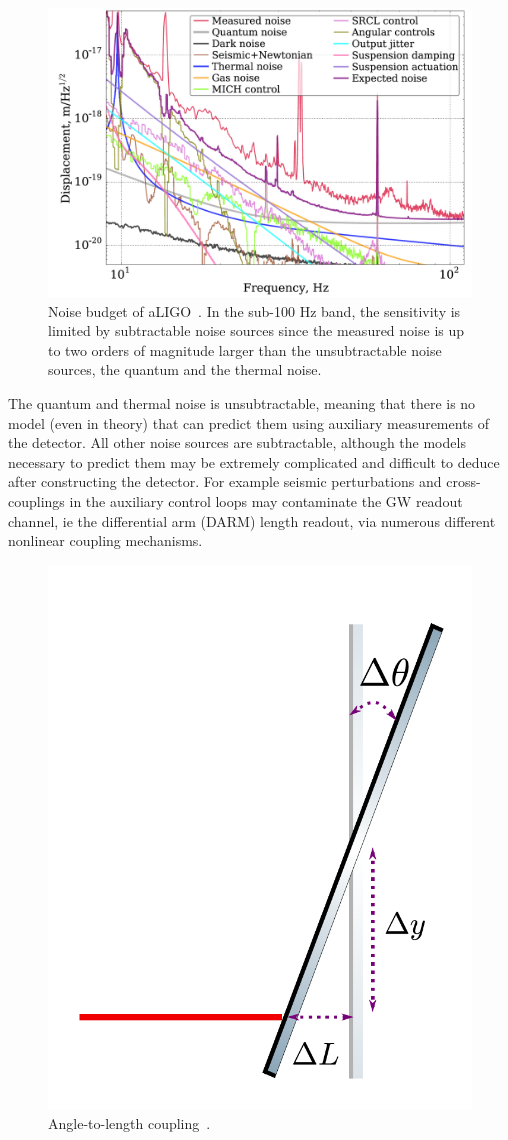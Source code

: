 \begin{refsection}
\begin{figure}[htbp]
   \centering
   \includegraphics[width=\columnwidth]{chapter_noise_sub/etc/noiseBudget}
   \caption[Noise Budget]{Noise budget of aLIGO~\cite{Martynov:16}.
     In the sub-100 Hz band, the sensitivity is limited by subtractable noise sources since the measured noise is up to two orders of magnitude larger than the unsubtractable noise sources, the quantum and the thermal noise.}
   \label{fig:noiseBudget}
\end{figure}

The quantum and thermal noise is unsubtractable, meaning that there is no model (even in theory) that can predict them using auxiliary measurements of the detector. All other noise sources are subtractable, although the models necessary to predict them may be extremely complicated and difficult to deduce after constructing the detector. For example seismic perturbations and cross-couplings in the auxiliary control loops may contaminate the GW readout channel, ie the differential arm (DARM) length readout, via numerous different nonlinear coupling mechanisms.

\begin{figure}[htbp]
   \centering
   \includegraphics[width=0.28\columnwidth]{chapter_noise_sub/etc/a2l}
   \caption{Angle-to-length coupling~\cite{Yu:19}.}
   \label{fig:a2l}
\end{figure}


\end{refsection}

